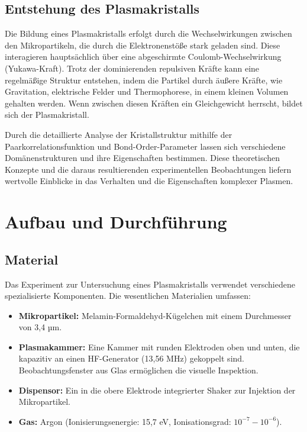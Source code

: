 \documentclass[12pt,a4paper,ngerman]{article}
\begin{document}


\subsection{Entstehung des Plasmakristalls}
Die Bildung eines Plasmakristalls erfolgt durch die Wechselwirkungen zwischen den Mikropartikeln, die durch die Elektronenstöße stark geladen sind. Diese interagieren hauptsächlich über eine abgeschirmte Coulomb-Wechselwirkung (Yukawa-Kraft). Trotz der dominierenden repulsiven Kräfte kann eine regelmäßige Struktur entstehen, indem die Partikel durch äußere Kräfte, wie Gravitation, elektrische Felder und Thermophorese, in einem kleinen Volumen gehalten werden. Wenn zwischen diesen Kräften ein Gleichgewicht herrscht, bildet sich der Plasmakristall.

Durch die detaillierte Analyse der Kristallstruktur mithilfe der Paarkorrelationsfunktion und Bond-Order-Parameter lassen sich verschiedene Domänenstrukturen und ihre Eigenschaften bestimmen. Diese theoretischen Konzepte und die daraus resultierenden experimentellen Beobachtungen liefern wertvolle Einblicke in das Verhalten und die Eigenschaften komplexer Plasmen.


\section{Aufbau und Durchführung}
	\subsection{Material}
	Das Experiment zur Untersuchung eines Plasmakristalls verwendet verschiedene spezialisierte Komponenten. Die wesentlichen Materialien umfassen:

\begin{itemize}
    \item \textbf{Mikropartikel:} Melamin-Formaldehyd-Kügelchen mit einem Durchmesser von 3,4 µm.
    \item \textbf{Plasmakammer:} Eine Kammer mit runden Elektroden oben und unten, die kapazitiv an einen HF-Generator (13,56 MHz) gekoppelt sind. Beobachtungsfenster aus Glas ermöglichen die visuelle Inspektion.
    \item \textbf{Dispensor:} Ein in die obere Elektrode integrierter Shaker zur Injektion der Mikropartikel.
    \item \textbf{Gas:} Argon (Ionisierungsenergie: 15,7 eV, Ionisationsgrad: \(10^{-7} - 10^{-6}\)).
\end{itemize}
\end{document}
